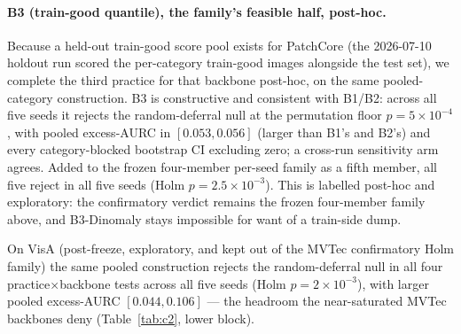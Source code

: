 \documentclass[preprint,11pt]{elsarticle}
\begin{document}
\paragraph{B3 (train-good quantile), the family's feasible half, post-hoc.} Because a held-out
train-good score pool exists for PatchCore (the 2026-07-10 holdout run scored the per-category
train-good images alongside the test set), we complete the third practice for that backbone
post-hoc, on the same pooled-category construction. B3 is constructive and consistent with B1/B2:
across all five seeds it rejects the random-deferral null at the permutation floor
$p=5\times10^{-4}$, with pooled excess-AURC in $[0.053,0.056]$ (larger than B1's and B2's) and every
category-blocked bootstrap CI excluding zero; a cross-run sensitivity arm agrees. Added to the
frozen four-member per-seed family as a fifth member, all five reject in all five seeds
(Holm $p=2.5\times10^{-3}$). This is labelled post-hoc and exploratory: the confirmatory verdict
remains the frozen four-member family above, and B3-Dinomaly stays impossible for want of a
train-side dump.

On VisA (post-freeze, exploratory, and kept out of the MVTec confirmatory Holm family) the same
pooled construction rejects the random-deferral null in all four practice$\times$backbone tests
across all five seeds (Holm $p=2\times10^{-3}$), with larger pooled excess-AURC $[0.044,0.106]$ ---
the headroom the near-saturated MVTec backbones deny (Table~\ref{tab:c2}, lower block).
\end{document}
